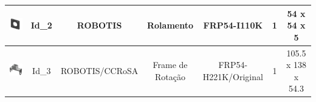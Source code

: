 \documentclass[
12pt,					%
openright,				%
twoside,				%
a4paper,				%
english,
brazil
]{ABNT/abntex2_report}
\begin{document}
\begin{table}[H]
\begin{adjustbox}{max width=\textwidth}
\begin{tabular}{|c|c|c|c|c|c|c|}
		\includegraphics[scale = 0.12]{appendix/fr54.png}            & Id\_2 & ROBOTIS        & Rolamento           & FRP54-I110K          & 1          & 54 x 54 x 5           \\ \hline
		\rowcolor[HTML]{EFEFEF} 
		\includegraphics[scale = 0.12]{appendix/frot1.png}       & Id\_3 & ROBOTIS/CCRoSA & Frame de Rotação    & FRP54-H221K/Original & 1          & 105.5 x 138 x 54.3    \\ \hline

\end{tabular}
\end{adjustbox}
\end{table}
\end{document}
